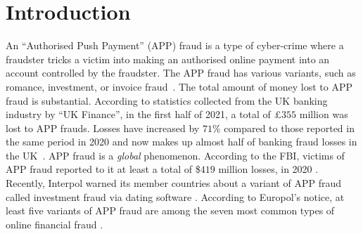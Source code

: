 
\vspace{-2mm}
\section{Introduction}\label{sec::intro}
\vspace{-1mm}

An  ``Authorised Push Payment'' (APP) fraud is a type of cyber-crime where a fraudster tricks a victim into making an authorised online payment into an account controlled by the fraudster.  The APP fraud has various variants, such as romance, investment, or invoice fraud~\cite{overview-of-payment-fraud}. The total amount of money lost to  APP fraud is substantial. According to
statistics collected from the UK banking industry by ``UK Finance'',  in the first half of 2021, a total of £$355$ million was lost to APP frauds. Losses have increased by  $71\%$  compared to those reported in the same period in 2020 and now makes up almost half of banking fraud losses in the UK~\cite{2021-Half-Year-Fraud-Update}. 
APP fraud is a \emph{global} phenomenon. According to the FBI, victims of APP fraud reported to it at least a total of  \$$419$ million losses, in 2020 \cite{internet-crime-report}. Recently, Interpol warned its member countries about a    variant of APP fraud called investment fraud via dating software \cite{interpol-notce}. According to  Europol’s notice, at least five variants of APP fraud are among the seven most common types of online financial fraud \cite{europol-notice}. 



